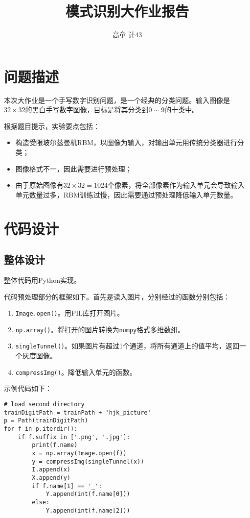 \documentclass{ctexart}
\title{\bfseries 模式识别大作业报告}
\author{\kaishu 高童 \quad 计43 \quad 2014011357}
\date{}
\begin{document}
\maketitle
\section{问题描述}
本次大作业是一个手写数字识别问题，是一个经典的分类问题。输入图像是$32 \times 32$的黑白手写数字图像，目标是将其分类到$0\sim 9$的十类中。

根据题目提示，实验要点包括：
\begin{itemize}
	\item 构造受限玻尔兹曼机RBM，以图像为输入，对输出单元用传统分类器进行分类；
	\item 图像格式不一，因此需要进行预处理；
	\item 由于原始图像有$32 \times 32=1024$个像素，将全部像素作为输入单元会导致输入单元数量过多，RBM训练过慢，因此需要通过预处理降低输入单元数量。
\end{itemize}

\section{代码设计}
\subsection{整体设计}
整体代码用Python实现。

代码预处理部分的框架如下。首先是读入图片，分别经过的函数分别包括：
\begin{enumerate}
	\item \texttt{Image.open()}。用PIL库打开图片。
	\item \texttt{np.array()}。将打开的图片转换为\texttt{numpy}格式多维数组。
	\item \texttt{singleTunnel()}。如果图片有超过1个通道，将所有通道上的值平均，返回一个灰度图像。
	\item \texttt{compressImg()}。降低输入单元的函数。
\end{enumerate}
示例代码如下：
\begin{verbatim}
# load second directory
trainDigitPath = trainPath + 'hjk_picture'
p = Path(trainDigitPath)
for f in p.iterdir():
    if f.suffix in ['.png', '.jpg']:
        print(f.name)
        x = np.array(Image.open(f))
        y = compressImg(singleTunnel(x))
        I.append(x)
        X.append(y)
        if f.name[1] == '_':
            Y.append(int(f.name[0]))
        else:
            Y.append(int(f.name[2]))
\end{verbatim}
\end{document}
